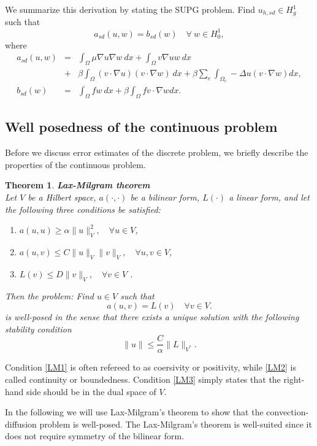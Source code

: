 \documentclass[a4paper,11pt]{amsart}
\newtheorem{theorem}{Theorem}[section]
\begin{document}
We summarize this derivation by stating the SUPG problem. 
Find $u_{h,sd}\in H_g^1$ such that 
\begin{equation}
\label{SUPG} 
a_{sd} (u,w) = b_{sd}(w) \quad \forall\ w\in H_0^1, 
\end{equation}
where
\begin{eqnarray*}
a_{sd}(u,w) &=& \int_\Omega\mu\nabla u\nabla w\ dx + \int_\Omega v\nabla uw\ dx \\
            &+& \beta \int_\Omega (v\cdot\nabla u) (v\cdot \nabla w)\ dx  + \beta \sum_e \int_{\Omega_e} -\Delta u (v\cdot\nabla w) dx ,  \\
b_{sd} (w) &=& \int_\Omega fw\ dx + \beta \int_\Omega f v \cdot \nabla w dx . 
\end{eqnarray*}



\subsection{Well posedness of the continuous problem}
Before we discuss error estimates of the discrete problem, we
briefly describe the properties of the continuous problem. 

\begin{theorem}{\textbf{Lax-Milgram theorem}} \\
Let $V$ be a Hilbert space, $a(\cdot, \cdot)$ be 
a bilinear form, $L(\cdot)$ a linear form, and let the following three conditions be satisfied: 
\begin{enumerate}
\item $a(u,u) \ge \alpha \|u\|^2_V, \quad \forall u \in V$,  \label{LM1} 
\item $a(u,v) \le C \|u\|_V \|v\|_V, \quad \forall u, v \in V$,  \label{LM2} 
\item $L(v) \le D \| v \|_V, \quad \forall v \in V$ .  \label{LM3} 
\end{enumerate}
Then the problem: Find $u\in V$ such that 
\[
a(u,v) = L(v) \quad \forall v \in V. 
\]
is well-posed in the sense that there exists a unique solution with the following 
stability condition
\[
\|u \| \le \frac{C}{\alpha} \|L\|_{V^*} .  
\]
\end{theorem}
Condition \eqref{LM1} is often refereed to as coersivity or positivity, while
\eqref{LM2} is called continuity or boundedness. Condition \ref{LM3} simply
states that the right-hand side should be in the dual space of $V$.    

In the following we will use Lax-Milgram's theorem to show that the convection-diffusion problem is well-posed. 
The Lax-Milgram's theorem is well-suited since it does not require symmetry of the bilinear form. 
\end{document}
